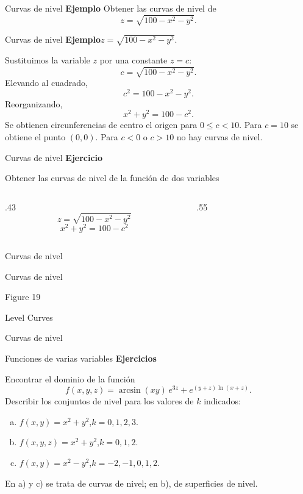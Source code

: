 \documentclass[main.tex]{subfiles}
\begin{document}
\begin{frame}{Curvas de nivel}
\textbf{Ejemplo}
\vfill
Obtener las curvas de nivel de
\[z=\sqrt{100-x^2-y^2}.\]
\vfill
\end{frame}
\begin{frame}{Curvas de nivel}
\small\textbf{Ejemplo}\quad $z=\sqrt{100-x^2-y^2}$.
\medskip

Sustituimos la variable $z$ por una constante $z=c$:
\[c=\sqrt{100-x^2-y^2}.\]
Elevando al cuadrado,
\[c^2=100-x^2-y^2.\]
Reorganizando,
\[x^2+y^2=100-c^2.\]
Se obtienen circunferencias de centro el origen para $0\le c<10$. Para $c=10$ se obtiene el punto $(0,0)$. Para $c<0$ o $c>10$ no hay curvas de nivel.
\end{frame}
\begin{frame}{Curvas de nivel}
\textbf{Ejercicio}\par
Obtener las curvas de nivel de la función de dos variables
\begin{columns}[c]
\begin{column}{.43\textwidth}
\[z=\sqrt{100-x^2-y^2}\]
\[x^2+y^2=100-c^2\]
\end{column}
\begin{column}{.55\textwidth}\end{column}
\end{columns}
\end{frame}
\begin{frame}{Curvas de nivel}
\end{frame}
\begin{frame}{Curvas de nivel}
\begin{center}\scriptsize Figure 19\end{center}
\end{frame}
\begin{frame}{Level Curves}
\end{frame}
\begin{frame}{Curvas de nivel}
\end{frame}
\begin{frame}{Funciones de varias variables}
\small\textbf{Ejercicios}
\medskip

Encontrar el dominio de la función
\[f(x,y,z)=\arcsin(xy)\,e^{3z}+e^{(y+z)\ln(x+z)}.\]
Describir los conjuntos de nivel para los valores de $k$ indicados:
\begin{enumerate}[a)]
\item $f(x,y)=x^2+y^2$,\quad $k=0,1,2,3$.
\item $f(x,y,z)=x^2+y^2$,\quad $k=0,1,2$.
\item $f(x,y)=x^2-y^2$,\quad $k=-2,-1,0,1,2$.
\end{enumerate}
En a) y c) se trata de curvas de nivel; en b), de superficies de nivel.
\end{frame}
\end{document}
